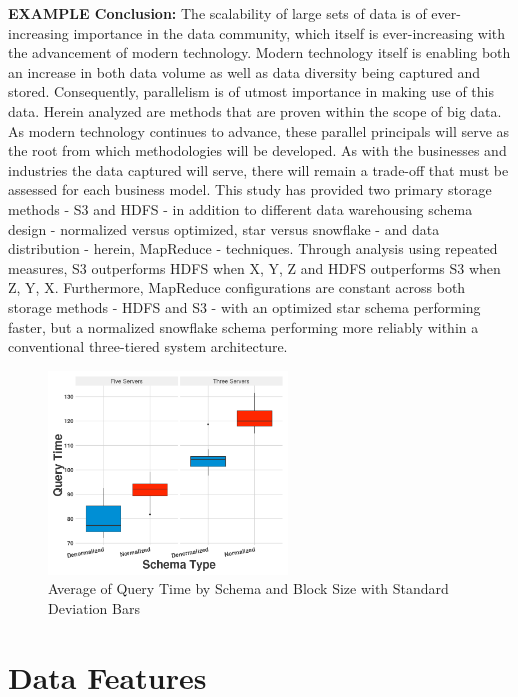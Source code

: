 \documentclass[journal]{IEEEtran}
\begin{document}
\textbf{EXAMPLE Conclusion:}
The scalability of large sets of data is of ever-increasing importance in the data community, which itself is ever-increasing with the advancement of modern technology. Modern technology itself is enabling both an increase in both data volume as well as data diversity being captured and stored. Consequently, parallelism is of utmost importance in making use of this data. Herein analyzed are methods that are proven within the scope of big data. As modern technology continues to advance, these parallel principals will serve as the root from which methodologies will be developed. As with the businesses and industries the data captured will serve, there will remain a trade-off that must be assessed for each business model. This study has provided two primary storage methods - S3 and HDFS - in addition to different data warehousing schema design - normalized versus optimized, star versus snowflake - and data distribution - herein, MapReduce - techniques. Through analysis using repeated measures, S3 outperforms HDFS when X, Y, Z and HDFS outperforms S3 when Z, Y, X. Furthermore, MapReduce configurations are constant across both storage methods - HDFS and S3 - with an optimized star schema performing faster, but a normalized snowflake schema performing more reliably within a conventional three-tiered system architecture.

\ifCLASSOPTIONcaptionsoff
  \newpage
\fi





\begin{figure}
	\centering
	\includegraphics[width=2.5in]{Rplot.png}
	\caption{Average of Query Time by Schema and Block Size with Standard Deviation Bars}
	\label{HDFS}
\end{figure}

\appendices

\section{Data Features}
\label{DataFeatures}
\end{document}

